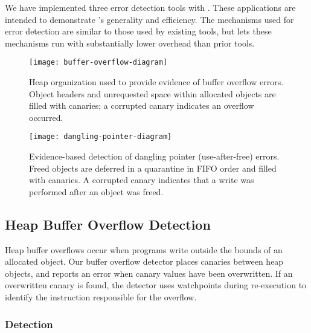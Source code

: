 \label{sec:applications}

We have implemented three error detection tools with \doubletake{}. These applications are intended to demonstrate \doubletake{}'s generality and efficiency. The mechanisms used for error detection are similar to those used by existing tools, but \doubletake{} lets these mechanisms run with substantially lower overhead than prior tools.

\begin{figure}[!t]
\begin{center}
\texttt{[image: buffer-overflow-diagram]}
\end{center}
\caption{Heap organization used to provide evidence of buffer overflow errors. Object headers and unrequested space within allocated objects are filled with canaries; a corrupted canary indicates an overflow occurred.
\label{fig:buffer-overflow}}
\end{figure}

\begin{figure}[!t]
\begin{center}
\texttt{[image: dangling-pointer-diagram]}
\end{center}
\caption{Evidence-based detection of dangling pointer (use-after-free) errors. Freed objects are deferred in a quarantine in FIFO order and filled with canaries. A corrupted canary indicates that a write was performed after an object was freed. 
\label{fig:dangling-pointer}}
\end{figure}

\subsection{Heap Buffer Overflow Detection}
\label{sec:applications/overflow}
Heap buffer overflows occur when programs write outside the bounds of an allocated object. Our buffer overflow detector places canaries between heap objects, and reports an error when canary values have been overwritten. If an overwritten canary is found, the detector uses watchpoints during re-execution to identify the instruction responsible for the overflow.

\subsubsection*{Detection}

